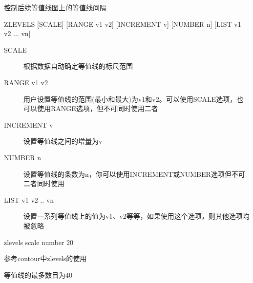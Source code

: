 \label{cmd:zlevels}

控制后续等值线图上的等值线间隔

\begin{SACSTX}
ZLEVELS [SCALE] [RANGE v1 v2] [INCREMENT v] [NUMBER n]
    [LIST v1 v2 ... vn]
\end{SACSTX}

\begin{description}
\item [SCALE] 根据数据自动确定等值线的标尺范围
\item [RANGE v1 v2] 用户设置等值线的范围(最小和最大)为v1和v2。可以使用SCALE选项，也可以使用RANGE选项，但不可同时使用二者
\item [INCREMENT v] 设置等值线之间的增量为v
\item [NUMBER n] 设置等值线的条数为n，你可以使用INCREMENT或NUMBER选项但不可二者同时使用
\item [LIST v1 v2 .. vn] 设置一系列等值线上的值为v1、v2等等，如果使用这个选项，则其他选项均被忽略
\end{description}

\begin{SACDFT}
zlevels scale number 20
\end{SACDFT}

参考contour中zlevels的使用

等值线的最多数目为40

